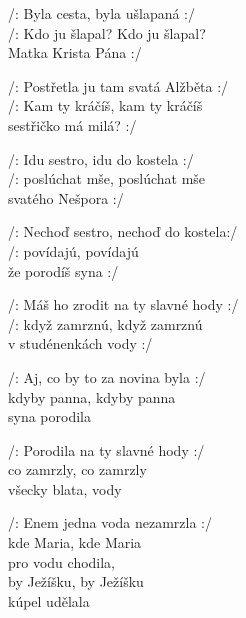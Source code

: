 
\ve{}
/: Byla cesta, byla ušlapaná :/\\
/: Kdo ju {š}lapal? Kdo ju {š}lapal?\\
Matka Krista Pána :/

\ve{}
/: Postřetla ju tam svatá Alžběta :/\\
/: Kam ty kráčíš, kam ty kráčíš\\
sestřičko má milá? :/

\ve{}
/: Idu sestro, idu do kostela :/\\
/: poslúchat mše, poslúchat mše\\
svatého Nešpora :/

\ve{}
/: Nechoď sestro, nechoď do kostela:/ \\
/: povídajú, povídajú\\
že porodíš syna :/

\ve{}
/: Máš ho zrodit na ty slavné hody :/\\
/: když zamrznú, když zamrznú\\
v studénenkách vody :/ 

\ve{}
/: Aj, co by to za novina byla :/\\
kdyby panna, kdyby panna\\
syna porodila

\ve{}
/: Porodila na ty slavné hody :/\\
co zamrzly, co zamrzly\\
všecky blata, vody

\ve{}
/: Enem jedna voda nezamrzla :/\\
kde Maria, kde Maria\\
pro vodu chodila,\\
by Ježíšku, by Ježíšku\\
kúpel udělala

\esong{}
